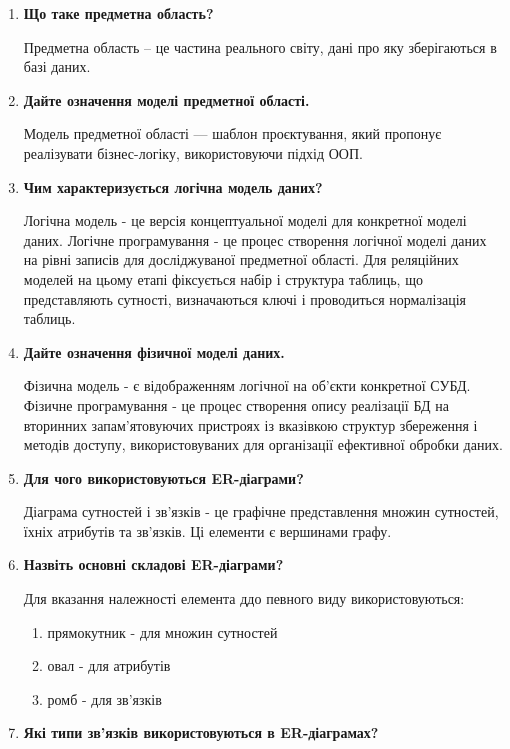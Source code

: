 \begin{enumerate}
\item \textbf{Що таке предметна область?}

Предметна область – це частина реального світу, дані про яку зберігаються в базі даних.

\item \textbf{Дайте означення моделі предметної області.}

Модель предметної області — шаблон проєктування, який пропонує реалізувати
бізнес-логіку, використовуючи підхід ООП.

\item \textbf{Чим характеризується логічна модель даних?}

Логічна модель - це версія концептуальної моделі для конкретної моделі даних.
Логічне програмування - це процес створення логічної моделі даних на рівні записів
для досліджуваної предметної області. Для реляційних моделей на цьому етапі
фіксується набір і структура таблиць, що представляють сутності, визначаються
ключі і проводиться нормалізація таблиць.

\item \textbf{Дайте означення фізичної моделі даних.}

Фізична модель - є відображенням логічної на об'єкти конкретної СУБД.
Фізичне програмування - це процес створення опису реалізації БД на вторинних
запам'ятовуючих пристроях із вказівкою структур збереження і методів доступу,
використовуваних для організації ефективної обробки даних.

\item \textbf{Для чого використовуються ER-діаграми?}

Діаграма сутностей і зв'язків - це графічне представлення множин сутностей,
їхніх атрибутів та зв'язків. Ці елементи є вершинами графу.

\item \textbf{Назвіть основні складові ER-діаграми?}

Для вказання належності елемента ддо певного виду використовуються:

\begin{enumerate}
    \item прямокутник - для множин сутностей
    \item овал - для атрибутів
    \item ромб - для зв'язків
\end{enumerate}

\item \textbf{Які типи зв'язків використовуються в ER-діаграмах?}


\end{enumerate}
